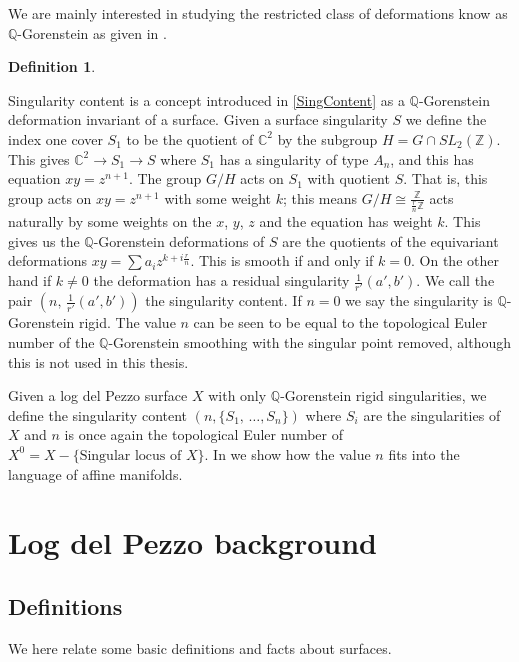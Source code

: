 \documentclass[12pt,a4paper]{book}      %
\newtheorem{dfn}[thm]{Definition}
\newcommand{\mb}[1]{\mathbb{#1}}
\newcommand{\ra}{\rightarrow}
\begin{document}
We are mainly interested in studying the restricted class of deformations know as $\mb{Q}$-Gorenstein as given in \cite{Kollar-SB}. 
\begin{dfn}

\end{dfn}
Singularity content is a concept introduced in \ref{SingContent} as a $\mb{Q}$-Gorenstein deformation invariant of a surface. Given a surface singularity $S$ we define the index one cover $S_1$ to be the quotient of $\mb{C}^2$  by the subgroup $H = G \cap SL_2(\mb{Z})$. This gives $\mb{C}^2 \ra S_1 \ra S$ where $S_1$ has a singularity of type $A_n$, and this has equation $xy = z^{n+1}$. The group $G/H$ acts on $S_1$ with quotient $S$. That is, this group acts on $xy = z^{n+1}$ with some weight $k$; this means $G/H \cong \frac{\mb{Z}}{\frac{r}{n}\mb{Z}}$ acts naturally by  some weights on the $x$, $y$, $z$ and the equation has weight $k$. This gives us the $\mb{Q}$-Gorenstein deformations  of $S$ are  the quotients of the equivariant deformations $xy = \sum a_i z^{k + i\frac{r}{n}}$. This is smooth if and only if $k=0$. On the other hand if $k\neq 0$ the deformation has a residual singularity $\frac{1}{r'}(a', b')$. We call the pair $(n, \, \frac{1}{r'}(a', b')) $ the singularity content. If $n=0$ we say the singularity is $\mb{Q}$-Gorenstein rigid. The value $n$ can be seen to be equal to the topological Euler number of the $\mb{Q}$-Gorenstein smoothing with the singular point removed, although this is not used in this thesis.


Given a log del Pezzo surface $X$ with only $\mb{Q}$-Gorenstein rigid singularities, we define the singularity content $(n, \{S_1, \, \dots, S_n\})$ where $S_i$ are the singularities of $X$ and $n$ is once again the topological Euler number of $X^0 = X - \{\text{Singular locus of } X\}$. In \cite{Section 4} we show how the value $n$ fits into the language of affine manifolds.
\section{Log del Pezzo background}

\subsection{Definitions}
We here relate some basic definitions and facts about surfaces.
\end{document}
